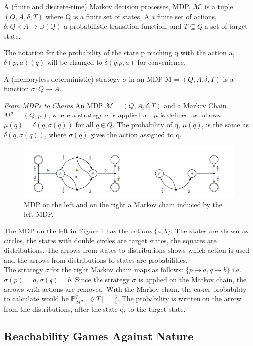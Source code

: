 \begin{definition}
\label{Markov decision processes}
A (finite and discrete-time) Markov decision processes, MDP, $\mathcal{M}$, is a tuple $(Q,A,\delta,T)$ 
where Q is a finite set of states, A a finite set of actions, $\delta: Q \times A \rightarrow \mathbb{D}(Q)$ 
a probabilistic transition function, and $T\subseteq Q$ a set of target state.
\end{definition}

\noindent
The notation for the probability of the state p reaching q with the action a, $\delta(p,a)(q)$ will be changed to 
$\delta(q|p,a)$ for convenience.

\begin{definition}[Strategies]
\label{Strategies}
A (memoryless deterministic) strategy $\sigma$ in an MDP M = $(Q,A,\delta,T)$ is a function $\sigma: Q\rightarrow A$.
\end{definition}

\noindent
\textit{From MDPs to Chains} An MDP $\mathcal{M} = (Q,A,\delta,T)$ and a Markov Chain $M^\sigma = (Q, \mu)$, 
where a strategy $\sigma$ is applied on. $\mu$ is defined as follows: $\mu(q)=\delta(q,\sigma(q))$ for all $q\in Q$.
The probability of q, $\mu(q)$, is the same as $\delta(q,\sigma(q))$, where $\sigma(q)$ gives the action assigned to q. 
\begin{figure}[htb]
	\begin{center}
		\includegraphics[width=1\linewidth]{pictures/strategies.png}
	\end{center}
	\caption{MDP on the left and 
    on the right a Markov chain induced by the left MDP. \cite{10.1007/978-3-319-89366-2_20}}
	\label{fig:strategies}
\end{figure}

\noindent
The MDP on the left in Figure \ref{fig:strategies} has the actions $\{a, b\}$. The states are shown as circles,
the states with double circles are target states, the squares are distributions. 
The arrows from states to distributions shows which action is used and the arrows from distributions to states are probabilities.
\newline
\\
The strategy $\sigma$ for the right Markov chain maps as follows: $\{p \mapsto a, q \mapsto b\}$ i.e. $\sigma(p) = a, \sigma(q) = b$.
Since the strategy $\sigma$ is applied on the Markov chain, the arrows with actions are removed. 
With the Markov chain, the easier probability to calculate would be $\mathbb{P}^{q}_{\mathcal{M}^\sigma}[\lozenge T] = \frac{3}{4}$.
The probability is written on the arrow from the distributions, after the state q, to the target state.

\subsection{Reachability Games Against Nature}
